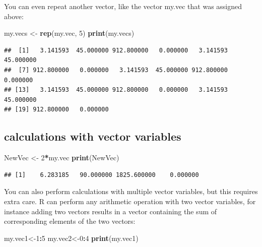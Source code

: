 \documentclass[
]{book}
\newenvironment{Shaded}{\begin{snugshade}}{\end{snugshade}}
\newcommand{\DecValTok}[1]{\textcolor[rgb]{0.00,0.00,0.81}{#1}}
\newcommand{\KeywordTok}[1]{\textcolor[rgb]{0.13,0.29,0.53}{\textbf{#1}}}
\newcommand{\NormalTok}[1]{#1}
\newcommand{\OperatorTok}[1]{\textcolor[rgb]{0.81,0.36,0.00}{\textbf{#1}}}
\newcommand{\StringTok}[1]{\textcolor[rgb]{0.31,0.60,0.02}{#1}}
\begin{document}
You can even repeat another vector, like the vector my.vec that was assigned above:

\begin{Shaded}
\begin{Highlighting}[]
\NormalTok{my.vecs \textless{}{-}}\StringTok{ }\KeywordTok{rep}\NormalTok{(my.vec, }\DecValTok{5}\NormalTok{)}
\KeywordTok{print}\NormalTok{(my.vecs)}
\end{Highlighting}
\end{Shaded}

\begin{verbatim}
##  [1]   3.141593  45.000000 912.800000   0.000000   3.141593  45.000000
##  [7] 912.800000   0.000000   3.141593  45.000000 912.800000   0.000000
## [13]   3.141593  45.000000 912.800000   0.000000   3.141593  45.000000
## [19] 912.800000   0.000000
\end{verbatim}

\hypertarget{calculations-with-vector-variables}{%
\subsection{calculations with vector variables}\label{calculations-with-vector-variables}}

\begin{Shaded}
\begin{Highlighting}[]
\NormalTok{NewVec \textless{}{-}}\StringTok{ }\DecValTok{2}\OperatorTok{*}\NormalTok{my.vec}
\KeywordTok{print}\NormalTok{(NewVec)}
\end{Highlighting}
\end{Shaded}

\begin{verbatim}
## [1]    6.283185   90.000000 1825.600000    0.000000
\end{verbatim}

You can also perform calculations with multiple vector variables, but this requires extra care. R can perform any arithmetic operation with two vector variables, for instance adding two vectors results in a vector containing the sum of corresponding elements of the two vectors:

\begin{Shaded}
\begin{Highlighting}[]
\NormalTok{my.vec1\textless{}{-}}\DecValTok{1}\OperatorTok{:}\DecValTok{5}
\NormalTok{my.vec2\textless{}{-}}\DecValTok{0}\OperatorTok{:}\DecValTok{4}
\KeywordTok{print}\NormalTok{(my.vec1)}
\end{Highlighting}
\end{Shaded}
\end{document}
